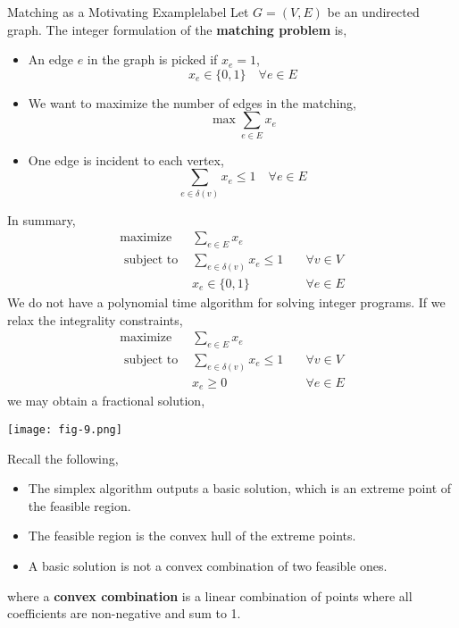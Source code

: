	\begin{ex}{Matching as a Motivating Example}{label}
		Let $G = (V, E)$ be an undirected graph. The integer formulation of the \textbf{matching problem} is,
		\begin{itemize}
			\item An edge $e$ in the graph is picked if $x_e = 1$,
			\[x_e \in \{0,1\} \quad \forall e \in E\]
			\item We want to maximize the number of edges in the matching,
			\[\max \sum_{e \in E} x_e\]
			\item One edge is incident to each vertex,
			\[\sum_{e \in \delta(v)} x_e \leq 1 \quad \forall e \in E\]
		\end{itemize}
		\noindent In summary,
		\[
			\begin{array}{lll}
				\operatorname{maximize} & \sum_{e \in E} x_{e} & \\
				\text{ subject to } & \sum_{e \in \delta(v)} x_{e} \leq 1 & \quad \forall v \in V \\
				& x_{e} \in\{0,1\} & \quad \forall e \in E
			\end{array}
		\]
		\noindent We do not have a polynomial time algorithm for solving integer programs. If we relax the integrality constraints,
		\[
			\begin{array}{lll}
				\operatorname{maximize} & \sum_{e \in E} x_{e} & \\
				\text{ subject to } & \sum_{e \in \delta(v)} x_{e} \leq 1 & \quad \forall v \in V \\
				& x_{e} \geq 0 & \quad \forall e \in E
			\end{array}
		\]
		\noindent we may obtain a fractional solution,
		\begin{center}
			\texttt{[image: fig-9.png]}
		\end{center}
	\end{ex}

	\begin{marginfigure}
		Recall the following,
		\begin{itemize}
			\item The simplex algorithm outputs a basic solution, which is an extreme point of the feasible region.
			\item The feasible region is the convex hull of the extreme points.
			\item A basic solution is not a convex combination of two feasible ones.
		\end{itemize}
		\noindent where a \textbf{convex combination} is a linear combination of points where all coefficients are non-negative and sum to 1.
	\end{marginfigure}

